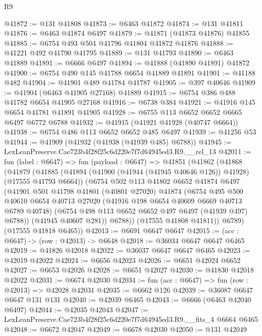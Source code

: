 \begin{lexlean}{R9}
\begin{coremodule}
@41872 := @131 @41808
@41873 := @6463 @41872
@41874 := @131 @41811
@41876 := @6463 @41874 @6497
@41879 := @41871 (@41873 @41876) @41855
@41885 := @6754 @493 @504 @41796 @41804 @41872 @41876
@41888 := @41221 @492 @41790 @41795
@41889 := @131 @41793
@41890 := @6463 @41889
@41891 := @6666 @6497
@41894 := @41888 (@41890 @41891) @41872
@41900 := @6754 @490 @145 @41788 @6654 @41889 @41891
@41901 := @41188 @482
@41904 := @41901 @489 @41784 @41787
@41905 := @397 @40646
@41909 := @41904 (@6463 @41905 @27168) @41889
@41915 := @6754 @386 @488 @41782 @6654 @41905 @27168
@41916 := @6738 @384
@41921 := @41916 @145 @6654 @41781 @41891 @41905
@41928 := @6755 @113 @6652 @6652 @6665 @6497 @6772 @6788
@41932 := @41915 (@41921 @41928 (@40747 @6664))
@41938 := @6754 @486 @113 @6652 @6652 @485 @6497
@41939 := @41256 @53
@41944 := @41909 (@41932 (@41938 (@41939 @485) @6788))
@41945 := LexLeanPreserve.Cae723b4f28f25c6d220e7f7d64945ed3.R9.__rel_13
@42011 := fun (label : @6647) =>
  fun (payload : @6647) =>
  @41851
    (@41862
      (@41868
        (@41879
          (@41885
            (@41894 (@41900 (@41944 (@41945 @40646 @126)) @41928) (@17555 @41793 @6664))
            (@6754
              @502
              @113
              @41802
              @6652
              @41874
              @6497
              (@41901
                @501
                @41798
                @41801
                (@40801 @27020)
                @41874
                (@6754
                  @495
                  @500
                  @40610
                  @6654
                  @40713
                  @27020
                  (@41916 @198 @6654 @40609 @6669 @40713 @6789 @40748)
                  (@6754 @498 @113 @6652 @6652 @497 @6497 (@41939 @497) @6788))
                (@41945 @40607 @281))
              @6788))
          (@17555 @41808 @41811))
        @6789)
      (@17555 @41818 @6465))
@42013 := @6691 @6647 @6647
@42015 := (acc : @6647) -> (row : @42013) -> @6648
@42018 := @36034 @6647 @6647 @6465
@42019 := @41826 @42018
@42022 := @36037 @6647 @6647 @6465
@42023 := @42019 @42022
@42024 := @6656 @42023
@42026 := @6651 @42024 @6652
@42027 := @6653 @42026
@42028 := @6651 @42027
@42030 := @41830 @42018 @42022
@42031 := @6674 @42030
@42034 := fun (acc : @6647) => fun (row : @42013) => @42028 @42031
@42035 := @6662 @126
@42039 := @36087 @6647 @6647 @131 @131
@42040 := @42039 @6465
@42043 := @6666 (@6463 @42040 @6497)
@42044 := @42035 @42043
@42047 := LexLeanPreserve.Cae723b4f28f25c6d220e7f7d64945ed3.R9.__fits_4 @6664 @6465
@42048 := @6672 @42047
@42049 := @6678 @42030
@42050 := @131 @42049

\end{coremodule}
\end{lexlean}
